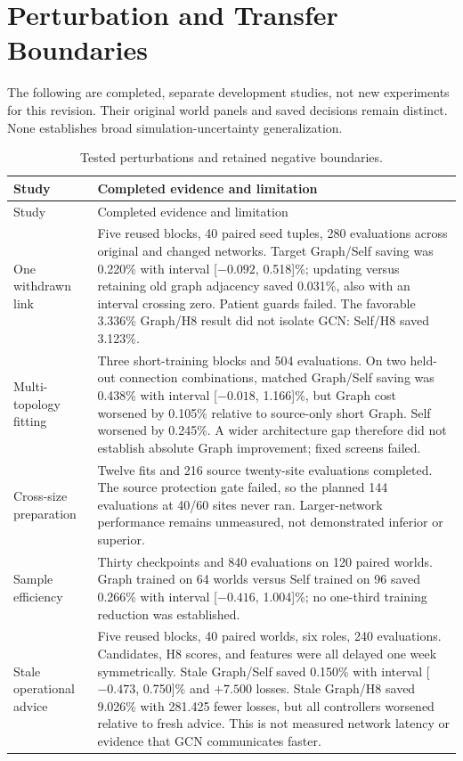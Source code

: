 \documentclass[preprint,12pt]{elsarticle}
\begin{document}
\section{Perturbation and Transfer Boundaries}
\label{app:robustness}
The following are completed, separate development studies, not new experiments
for this revision. Their original world panels and saved decisions remain
distinct. None establishes broad simulation-uncertainty generalization.

{\small
\begin{longtable}{>{\raggedright\arraybackslash}p{} >{\raggedright\arraybackslash}p{}}
\caption{Tested perturbations and retained negative boundaries.}
\label{tab:transfer}\\
\toprule
Study & Completed evidence and limitation\\
\midrule
\endfirsthead
\toprule
Study & Completed evidence and limitation\\
\midrule
\endhead
\bottomrule
\endfoot
One withdrawn link & Five reused blocks, 40 paired seed tuples, 280 evaluations
across original and changed networks. Target Graph/Self saving was 0.220\%
with interval [$-0.092$, 0.518]\%; updating versus retaining old graph adjacency
saved 0.031\%, also with an interval crossing zero. Patient guards failed.
The favorable 3.336\% Graph/H8 result did not isolate GCN: Self/H8 saved 3.123\%.\\
\addlinespace
Multi-topology fitting & Three short-training blocks and 504 evaluations.
On two held-out connection combinations, matched Graph/Self saving was 0.438\%
with interval [$-0.018$, 1.166]\%, but Graph cost worsened by 0.105\% relative
to source-only short Graph. Self worsened by 0.245\%. A wider architecture gap
therefore did not establish absolute Graph improvement; fixed screens failed.\\
\addlinespace
Cross-size preparation & Twelve fits and 216 source twenty-site evaluations
completed. The source protection gate failed, so the planned 144 evaluations
at 40/60 sites never ran. Larger-network performance remains unmeasured, not
demonstrated inferior or superior.\\
\addlinespace
Sample efficiency & Thirty checkpoints and 840 evaluations on 120 paired
worlds. Graph trained on 64 worlds versus Self trained on 96 saved 0.266\%
with interval [$-0.416$, 1.004]\%; no one-third training reduction was established.\\
\addlinespace
Stale operational advice & Five reused blocks, 40 paired worlds, six roles,
240 evaluations. Candidates, H8 scores, and features were all delayed one
week symmetrically. Stale Graph/Self saved 0.150\% with interval
[$-0.473$, 0.750]\% and $+7.500$ losses. Stale Graph/H8 saved 9.026\% with
281.425 fewer losses, but all controllers worsened relative to fresh advice.
This is not measured network latency or evidence that GCN communicates faster.\\
\end{longtable}
}
\end{document}
